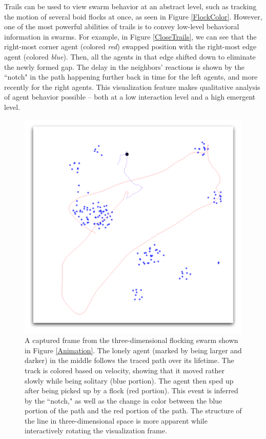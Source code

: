 \documentclass{vgtc}
\begin{document}
Trails can be used to view swarm behavior at an abstract level, such as tracking the motion of several boid
flocks at once, as seen in Figure \ref{FlockColor}.
However, one of the most powerful abilities of trails is to convey low-level behavioral information in swarms.
For example, in Figure \ref{CloseTrails}, we can see that the right-most corner agent (colored \textit{red})
swapped position with the right-most edge agent (colored \textit{blue}).
Then, all the agents in that edge shifted down to eliminate the newly formed gap.
The delay in the neighbors' reactions is shown by the ``notch" in the path happening
further back in time for the left agents, and more recently for the right agents.
This visualization feature makes qualitative analysis of agent behavior possible -- both at a low interaction level
and a high emergent level.







\begin{figure}
\centering
\includegraphics[scale=.5]{images/track.pdf}
\caption{
A captured frame from the three-dimensional flocking swarm shown in Figure \ref{Animation}.
The lonely agent (marked by being larger and darker) in the middle follows the traced path over its lifetime.
The track is colored based on velocity, showing that it moved rather slowly while being solitary (blue portion).
The agent then sped up after being picked up by a flock (red portion).
This event is inferred by the ``notch," as well as the change in color between the blue portion of the  path and the red portion of the path.
The structure of the line in three-dimensional space is more apparent while interactively rotating the visualization frame.}
\label{Track}
\end{figure}
\end{document}
